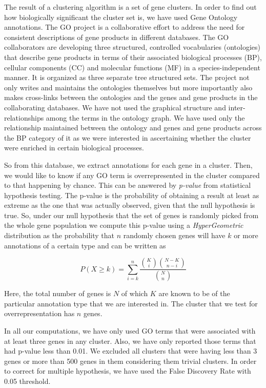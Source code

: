 The result of a clustering algorithm is a set of gene clusters. In order to find out how biologically significant the cluster set is, we have used 
Gene Ontology \citep{GO} annotations. The GO  project is a collaborative effort to address the need for consistent descriptions of gene products in different databases. 
The GO collaborators are developing three structured, controlled vocabularies (ontologies) that describe gene products in terms of their associated biological processes (BP), 
cellular components (CC) and molecular functions (MF) in a species-independent manner. It is organized as three separate tree structured sets. The project not only writes 
and maintains the ontologies themselves but more importantly also makes cross-links between the ontologies and the genes and gene products in the collaborating databases. 
We have not used the graphical structure and inter-relationships among the terms in the ontology graph. We have used only the relationship maintained between the 
ontology and genes and gene products across the BP category of it as we were interested in ascertaining whether the cluster were enriched in certain biological processes.

So from this database, we extract annotations for each gene in a cluster. Then, we would like to know if any GO term is  overrepresented in the cluster compared to that happening by chance. This can be answered by \textit{p-value} from statistical hypothesis testing. The p-value is the probability of obtaining a result at least as extreme as the one that was actually observed, given that the null hypothesis is true. So, under our null hypothesis that the set of genes is randomly picked from the whole gene population we compute this p-value using a \textit{HyperGeometric} distribution as the probability that $n$ randomly chosen genes will have $k$ or more annotations of a certain type and can be written as

\[
P(X \geq k) = \sum_{i=k}^{n} \frac{\binom{K}{i} \binom{N-K}{n-i}}{\binom {N}{n}}
\]
 
Here, the total number of genes is $N$ of which $K$ are known to be of the particular annotation type that we are interested in. The cluster that we test for overrepresentation has $n$ genes.

In all our computations, we have only used GO terms that were associated with at least three genes in any cluster. Also, we have only reported those terms that had p-value less than 0.01. We excluded all clusters that were having less than 3 genes or more than 500 genes in them considering them trivial clusters. In order to correct for multiple hypothesis, we have used the False Discovery Rate with 0.05 threshold.  
